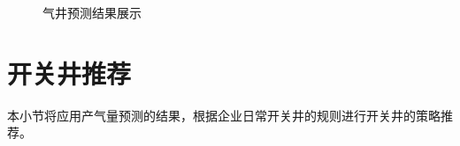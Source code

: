 \begin{figure}[H]
    \hfil
    \caption{气井预测结果展示}
    \label{fig:6predicre}
\end{figure}

\section{开关井推荐}
本小节将应用产气量预测的结果，根据企业日常开关井的规则进行开关井的策略推荐。
